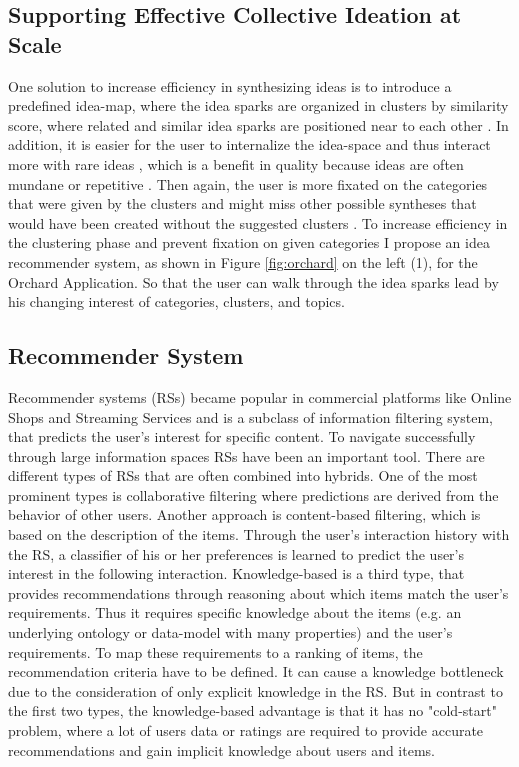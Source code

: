 \documentclass[pdftex,a4paper,12pt]{scrartcl}
\theoremstyle{definition}
\begin{document}
\subsection{Supporting Effective Collective Ideation at Scale}
    One solution to increase efficiency in synthesizing ideas is to introduce a predefined idea-map, where the idea sparks are organized in clusters by similarity score, where related and similar idea sparks are positioned near to each other \citep[124]{siangliulue_supporting_2017}. In addition, it is easier for the user to internalize the idea-space and thus interact more with rare ideas \citep{siangliulue_supporting_2017}, which is a benefit in quality because ideas are often mundane or repetitive \citep{siangliulue_ideahound:_2016}. Then again, the user is more fixated on the categories that were given by the clusters and might miss other possible syntheses that would have been created without the suggested clusters \citep{siangliulue_supporting_2017}. To increase efficiency in the clustering phase and prevent fixation on given categories I propose an idea recommender system, as shown in Figure \ref{fig:orchard} on the left (1), for the Orchard Application. So that the user can walk through the idea sparks lead by his changing interest of categories, clusters, and topics. 
    
\subsection{Recommender System}
Recommender systems (RSs) became popular in commercial platforms like Online Shops and Streaming Services and is a subclass of information filtering system, that predicts the user's interest for specific content. To navigate successfully through large information spaces RSs have been an important tool. There are different types of RSs that are often combined into hybrids. One of the most prominent types is collaborative filtering where predictions are derived from the behavior of other users. Another approach is content-based filtering, which is based on the description of the items. Through the user's interaction history with the RS, a classifier of his or her preferences is learned to predict the user's interest in the following interaction. 
Knowledge-based is a third type, that provides recommendations through reasoning about which items match the user's requirements. Thus it requires specific knowledge about the items (e.g. an underlying ontology or data-model with many properties) and the user's requirements. To map these requirements to a ranking of items, the recommendation criteria have to be defined. It can cause a knowledge bottleneck due to the consideration of only explicit knowledge in the RS.
But in contrast to the first two types, the knowledge-based advantage is that it has no "cold-start" problem, where a lot of users data or ratings are required to provide accurate recommendations and gain implicit knowledge about users and items. 
\end{document}
